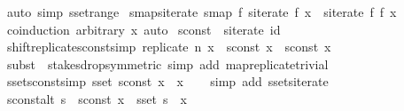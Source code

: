 \begin{isabellebody}
\ {\isacharparenleft}auto\ simp{\isacharcolon}\ sset{\isacharunderscore}range{\isacharparenright}%
\endisatagproof
{\isafoldproof}%
%
\isadelimproof
\isanewline
%
\endisadelimproof
\isanewline
{}\isamarkupfalse%
\ smap{\isacharunderscore}siterate{\isacharcolon}\ {\isachardoublequoteopen}smap\ f\ {\isacharparenleft}siterate\ f\ x{\isacharparenright}\ {\isacharequal}\ siterate\ f\ {\isacharparenleft}f\ x{\isacharparenright}{\isachardoublequoteclose}\isanewline
%
\isadelimproof
\ \ %
\endisadelimproof
%
\isatagproof
{}\isamarkupfalse%
\ {\isacharparenleft}coinduction\ arbitrary{\isacharcolon}\ x{\isacharparenright}\ auto%
\endisatagproof
{\isafoldproof}%
%
\isadelimproof
%
\endisadelimproof
%
\isadelimdocument
%
\endisadelimdocument
%
\isatagdocument
%
\isamarkuptrue%
%
\endisatagdocument
{\isafolddocument}%
%
\isadelimdocument
%
\endisadelimdocument
{}\isamarkupfalse%
\ {\isachardoublequoteopen}sconst\ {\isasymequiv}\ siterate\ id{\isachardoublequoteclose}\isanewline
\isanewline
{}\isamarkupfalse%
\ shift{\isacharunderscore}replicate{\isacharunderscore}sconst{\isacharbrackleft}simp{\isacharbrackright}{\isacharcolon}\ {\isachardoublequoteopen}replicate\ n\ x\ {\isacharat}{\isacharminus}\ sconst\ x\ {\isacharequal}\ sconst\ x{\isachardoublequoteclose}\isanewline
%
\isadelimproof
\ \ %
\endisadelimproof
%
\isatagproof
{}\isamarkupfalse%
\ {\isacharparenleft}subst\ {\isacharparenleft}{}{\isacharparenright}\ stake{\isacharunderscore}sdrop{\isacharbrackleft}symmetric{\isacharbrackright}{\isacharparenright}\ {\isacharparenleft}simp\ add{\isacharcolon}\ map{\isacharunderscore}replicate{\isacharunderscore}trivial{\isacharparenright}%
\endisatagproof
{\isafoldproof}%
%
\isadelimproof
\isanewline
%
\endisadelimproof
\isanewline
{}\isamarkupfalse%
\ sset{\isacharunderscore}sconst{\isacharbrackleft}simp{\isacharbrackright}{\isacharcolon}\ {\isachardoublequoteopen}sset\ {\isacharparenleft}sconst\ x{\isacharparenright}\ {\isacharequal}\ {\isacharbraceleft}x{\isacharbraceright}{\isachardoublequoteclose}\isanewline
%
\isadelimproof
\ \ %
\endisadelimproof
%
\isatagproof
{}\isamarkupfalse%
\ {\isacharparenleft}simp\ add{\isacharcolon}\ sset{\isacharunderscore}siterate{\isacharparenright}%
\endisatagproof
{\isafoldproof}%
%
\isadelimproof
\isanewline
%
\endisadelimproof
\isanewline
{}\isamarkupfalse%
\ sconst{\isacharunderscore}alt{\isacharcolon}\ {\isachardoublequoteopen}s\ {\isacharequal}\ sconst\ x\ {\isasymlongleftrightarrow}\ sset\ s\ {\isacharequal}\ {\isacharbraceleft}x{\isacharbraceright}{\isachardoublequoteclose}\isanewline

\end{isabellebody}
